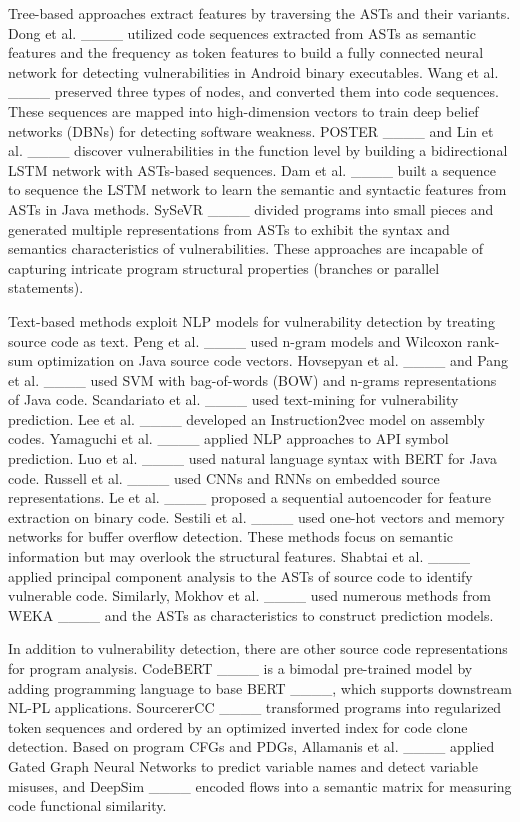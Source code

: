 Tree-based approaches extract features by traversing the ASTs and their variants. Dong et al. ____ utilized code sequences extracted from ASTs as semantic features and the frequency as token features to build a fully connected neural network for detecting vulnerabilities in Android binary executables. Wang et al. ____ preserved three types of nodes, and converted them into code sequences. These sequences are mapped into high-dimension vectors to train deep belief networks (DBNs) for detecting software weakness. POSTER ____ and Lin et al. ____ discover vulnerabilities in the function level by building a bidirectional LSTM network with ASTs-based sequences. Dam et al. ____ built a sequence to sequence the LSTM network to learn the semantic and syntactic features from ASTs in Java methods. SySeVR ____ divided programs into small pieces and generated multiple representations from ASTs to exhibit the syntax and semantics characteristics of vulnerabilities. These approaches are incapable of capturing intricate program structural properties (branches or parallel statements).


Text-based methods exploit NLP models for vulnerability detection by treating source code as text. Peng et al. ____ used n-gram models and Wilcoxon rank-sum optimization on Java source code vectors. Hovsepyan et al. ____ and Pang et al. ____ used SVM with bag-of-words (BOW) and n-grams representations of Java code. Scandariato et al. ____ used text-mining for vulnerability prediction. Lee et al. ____ developed an Instruction2vec model on assembly codes. Yamaguchi et al. ____ applied NLP approaches to API symbol prediction. Luo et al. ____ used natural language syntax with BERT for Java code. Russell et al. ____ used CNNs and RNNs on embedded source representations. Le et al. ____ proposed a sequential autoencoder for feature extraction on binary code. Sestili et al. ____ used one-hot vectors and memory networks for buffer overflow detection. These methods focus on semantic information but may overlook the structural features. Shabtai et al. ____ applied principal component analysis to the ASTs of source code to identify vulnerable code. Similarly, Mokhov et al. ____ used numerous methods from WEKA ____ and the ASTs as characteristics to construct prediction models.

In addition to vulnerability detection, there are other source code representations for program analysis. CodeBERT ____ is a bimodal pre-trained model by adding programming language to base BERT ____, which supports downstream NL-PL applications. SourcererCC ____ transformed programs into regularized token sequences and ordered by an optimized inverted index for code clone detection. Based on program CFGs and PDGs, Allamanis et al. ____ applied Gated Graph Neural Networks to predict variable names and detect variable misuses, and DeepSim ____ encoded flows into a semantic matrix for measuring code functional similarity.